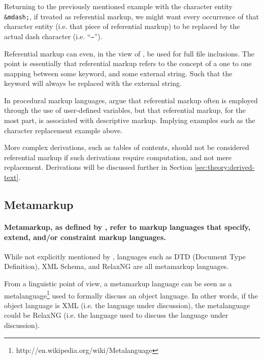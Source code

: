 \documentclass{scrreprt}
\begin{document}
Returning to the previously mentioned example with the character entity \texttt{\&mdash;}, if treated as referential markup, we might want every occurrence of that character entity (i.e. that piece of referential markup) to be replaced by the actual dash character (i.e. ``\texttt{--}'').

Referential markup can even, in the view of \citet{coombs}, be used for full file inclusions. The point is essentially that referential markup refers to the concept of a one to one mapping between some keyword, and some external string. Such that the keyword will always be replaced with the external string.

In procedural markup languages, \citet{coombs} argue that referential markup often is employed through the use of user-defined variables, but that referential markup, for the most part, is associated with descriptive markup. Implying examples such as the character replacement example above.

More complex derivations, such as tables of contents, should not be considered referential markup if such derivations require computation, and not mere replacement. Derivations will be discussed further in Section \ref{sec:theory:derived-text}.





\subsection{Metamarkup}
\paragraph{Metamarkup, as defined by \citet{coombs}, refer to markup languages that specify, extend, and/or constraint markup languages.} While not explicitly mentioned by \citet{coombs}, languages such as DTD (Document Type Definition), XML Schema, and RelaxNG are all metamarkup languages.


From a linguistic point of view, a metamarkup language can be seen as a metalanguage\footnote{ http://en.wikipedia.org/wiki/Metalanguage} used to formally discuss an object language. In other words, if the object language is XML (i.e. the language under discussion), the metalanguage could be RelaxNG (i.e. the language used to discuss the language under discussion).
\end{document}
